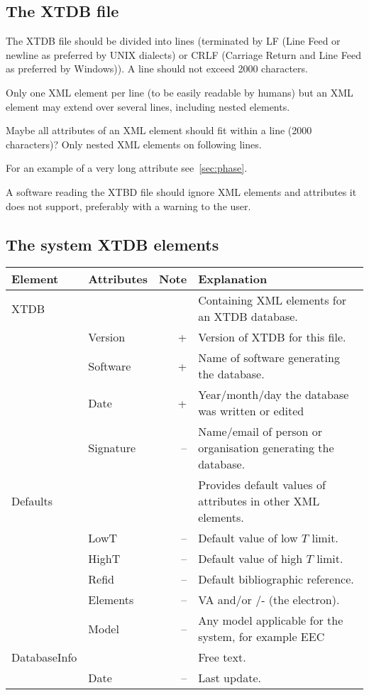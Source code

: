 \documentclass{article}
\begin{document}
\subsection{The XTDB file}

The XTDB file should be divided into lines (terminated by LF (Line
Feed or newline as preferred by UNIX dialects) or CRLF (Carriage Return
and Line Feed as preferred by Windows)).  A line should not exceed
2000 characters.

Only one XML element per line (to be easily readable by humans) but an
XML element may extend over several lines, including nested elements.

Maybe all attributes of an XML element should fit within a line (2000
characters)?  Only nested XML elements on following lines.

For an example of a very long attribute see~\ref{sec:phase}.

A software reading the XTBD file should ignore XML elements and
attributes it does not support, preferably with a warning to the user.



\newpage

\subsection{The system XTDB elements}

\bigskip
\begin{tabular}{|p{} p{} r p{}|}\hline
  Element & Attributes & Note & Explanation\\\hline

  XTDB    & && Containing XML elements for an XTDB database.\\
          & Version & + & Version of XTDB for this file.\\
          &Software & + & Name of software generating the database.\\
          &Date     & + & Year/month/day the database was written or edited\\
          &Signature& -- & Name/email of person or organisation generating the database.\\\hline
  
  Defaults & && Provides default values of attributes in other XML elements.\\
           & LowT & -- & Default value of low $T$ limit.\\
           & HighT & -- & Default value of high $T$ limit.\\
           & Refid & -- & Default bibliographic reference. \\
           & Elements & -- & VA and/or /- (the electron).\\
           & Model & -- & Any model applicable for the system, for example EEC\\\hline

  DatabaseInfo & && Free text.\\
  & Date & -- & Last update.\\\hline

\end{tabular}
\end{document}
